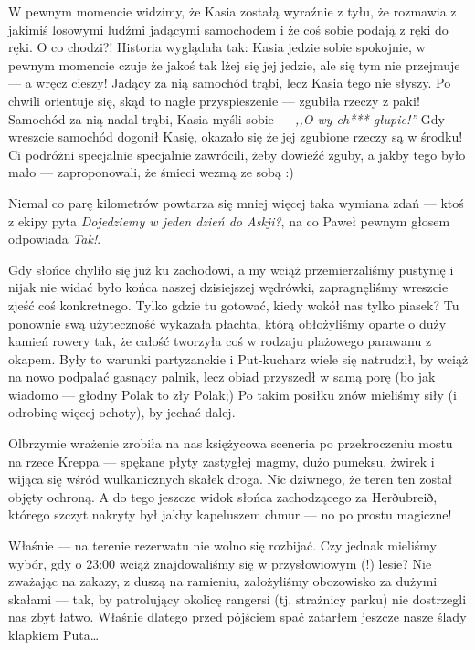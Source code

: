 
W pewnym momencie widzimy, że Kasia zostałą wyraźnie z tyłu, że rozmawia z jakimiś losowymi ludźmi jadącymi samochodem i że coś sobie podają z ręki do ręki. O co chodzi?! Historia wyglądała tak: Kasia jedzie sobie spokojnie, w pewnym momencie czuje że jakoś tak lżej się jej jedzie, ale się tym nie przejmuje --- a wręcz cieszy! Jadący za nią samochód trąbi, lecz Kasia tego nie słyszy. Po chwili orientuje się, skąd to nagłe przyspieszenie --- zgubiła rzeczy z paki! Samochód za nią nadal trąbi, Kasia myśli sobie --- \emph{,,O wy ch*** głupie!''} Gdy wreszcie samochód dogonił Kasię, okazało się że jej zgubione rzeczy są w środku! Ci podróżni specjalnie specjalnie zawrócili, żeby dowieźć zguby, a jakby tego było mało --- zaproponowali, że śmieci wezmą ze sobą :)

Niemal co parę kilometrów powtarza się mniej więcej taka wymiana zdań --- ktoś z ekipy pyta \emph{Dojedziemy w jeden dzień do Askji?}, na co Paweł pewnym głosem odpowiada \emph{Tak!}.


Gdy słońce chyliło się już ku zachodowi, a my wciąż przemierzaliśmy pustynię i nijak nie widać było końca naszej dzisiejszej wędrówki, zapragnęliśmy wreszcie zjeść coś konkretnego. Tylko gdzie tu gotować, kiedy wokół nas tylko piasek? Tu ponownie swą użyteczność wykazała płachta, którą obłożyliśmy oparte o duży kamień rowery tak, że całość tworzyła coś w rodzaju plażowego parawanu z okapem. Były to warunki partyzanckie i Put-kucharz wiele się natrudził, by wciąż na nowo podpalać gasnący palnik, lecz obiad przyszedł w samą porę (bo jak wiadomo --- głodny Polak to zły Polak;) Po takim posiłku znów mieliśmy siły (i odrobinę więcej ochoty), by jechać dalej.

Olbrzymie wrażenie zrobiła na nas księżycowa sceneria po przekroczeniu mostu na rzece Kreppa --- spękane płyty zastygłej magmy, dużo pumeksu, żwirek i wijąca się wśród wulkanicznych skałek droga. Nic dziwnego, że teren ten został objęty ochroną. A do tego jeszcze widok słońca zachodzącego za Herðubreið, którego szczyt nakryty był jakby kapeluszem chmur --- no po prostu magiczne!

Właśnie --- na terenie rezerwatu nie wolno się rozbijać. Czy jednak mieliśmy wybór, gdy o 23:00 wciąż znajdowaliśmy się w przysłowiowym (!) lesie? Nie zważając na zakazy, z duszą na ramieniu, założyliśmy obozowisko za dużymi skałami --- tak, by patrolujący okolicę rangersi (tj. strażnicy parku) nie dostrzegli nas zbyt łatwo. Właśnie dlatego przed pójściem spać zatarłem jeszcze nasze ślady klapkiem Puta…


